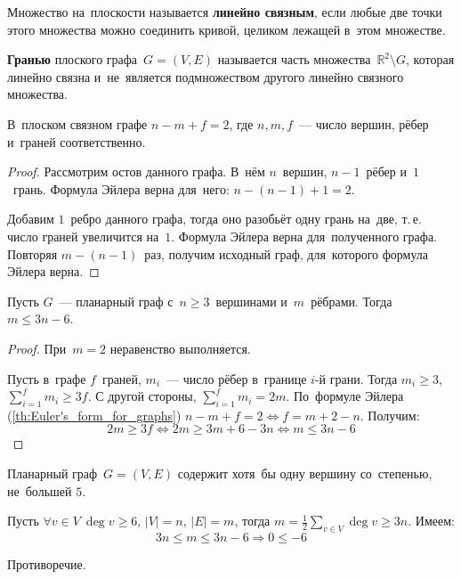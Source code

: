 Множество на~плоскости называется \textbf{линейно связным}, если любые две точки этого множества можно соединить кривой, целиком лежащей в~этом множестве.

\textbf{Гранью} плоского графа~$G = (V, E)$ называется часть множества~$\mathbb R^2 \setminus G$, которая линейно связна и~не~является подмножеством другого линейно связного множества.

\begin{theorem}
\label{th:Euler's_form_for_graphs}
В~плоском связном графе $n - m + f = 2$, где $n, m, f$~--- число вершин, рёбер и~граней соответственно.
\end{theorem}
\begin{proof}
Рассмотрим остов данного графа.
В~нём $n$~вершин, $n - 1$~рёбер и~$1$~грань.
Формула Эйлера верна для~него: $n - (n - 1) + 1 = 2$.

Добавим $1$~ребро данного графа, тогда оно разобьёт одну грань на~две, т.\,е. число граней увеличится на~$1$.
Формула Эйлера верна для~полученного графа.
Повторяя $m - (n - 1)$~раз, получим исходный граф, для~которого формула Эйлера верна.
\end{proof}

\begin{theorem}
\label{th:necessary_condition_of_planarity_of_graph}
Пусть $G$~--- планарный граф с~$n \geqslant 3$~вершинами и~$m$~рёбрами. Тогда $m \leqslant 3n - 6$.
\end{theorem}
\begin{proof}
При~$m = 2$ неравенство выполняется.

Пусть в~графе $f$~граней, $m_i$~--- число рёбер в~границе $i$\nobreakdash-й грани.
Тогда $m_i \geqslant 3$, $\displaystyle \sum_{i=1}^f m_i \geqslant 3f$.
С другой стороны, $\displaystyle \sum_{i=1}^f m_i = 2m$.
По~формуле Эйлера (\ref{th:Euler's_form_for_graphs}) $n - m + f = 2 \Leftrightarrow f = m + 2 - n$.
Получим:
\begin{equation*}
2m \geqslant 3f \Leftrightarrow 2m \geqslant 3m + 6 - 3n \Leftrightarrow m \leqslant 3n - 6
\end{equation*}
\end{proof}

\begin{consequent}
Планарный граф~$G = (V, E)$ содержит хотя~бы одну вершину со~степенью, не~большей $5$.
\end{consequent}
\begin{proofcontra}
Пусть $\forall v \in V \ \deg v \geqslant 6$, $|V| = n$, $|E| = m$, тогда
$\displaystyle m = \frac12 \sum_{v \in V} \deg v \geqslant 3n$. Имеем:
\begin{equation*}
3n \leqslant m \leqslant 3n - 6 \Rightarrow 0 \leqslant -6
\end{equation*}

Противоречие.
\end{proofcontra}

